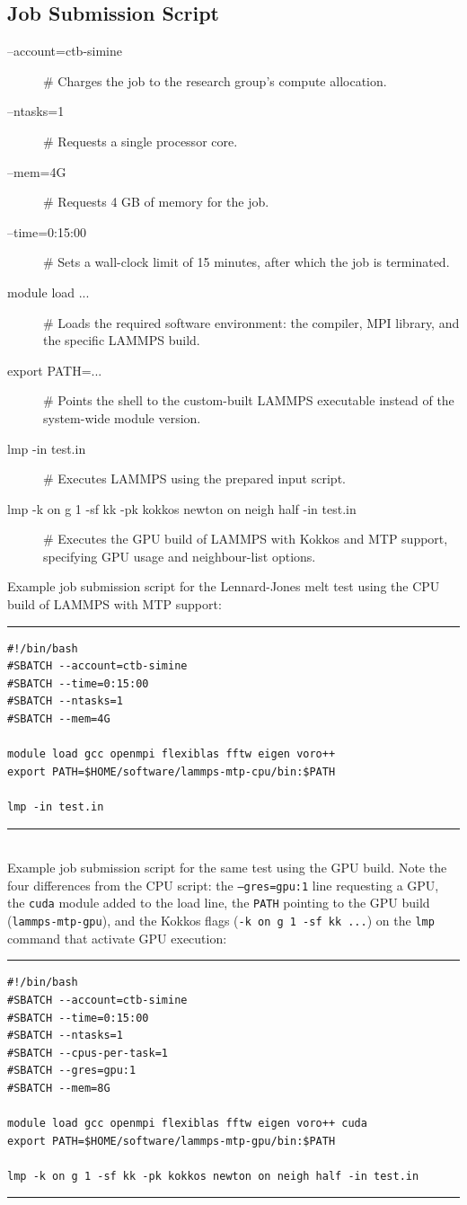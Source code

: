 \documentclass{article}
\begin{document}
\subsection{Job Submission Script}
\label{JSS}
\begin{description}
    \item[--account=ctb-simine] \# Charges the job to the research group's compute allocation.
    \item[--ntasks=1] \# Requests a single processor core.
    \item[--mem=4G] \# Requests 4 GB of memory for the job.
    \item[--time=0:15:00] \# Sets a wall-clock limit of 15 minutes, after which the job is terminated.
    \item[module load ...] \# Loads the required software environment: the compiler, MPI library, and the specific LAMMPS build.
    \item[export PATH=...] \# Points the shell to the custom-built LAMMPS executable instead of the system-wide module version.
    \item[lmp -in test.in] \# Executes LAMMPS using the prepared input script.
    \item[lmp -k on g 1 -sf kk -pk kokkos newton on neigh half -in test.in] \# Executes the GPU build of LAMMPS with Kokkos and MTP support, specifying GPU usage and neighbour-list options.
\end{description}
Example job submission script for the Lennard-Jones melt test using the CPU build of LAMMPS with MTP support:\\
\noindent\rule{\textwidth}{0.4pt}
\begin{verbatim}
#!/bin/bash
#SBATCH --account=ctb-simine
#SBATCH --time=0:15:00
#SBATCH --ntasks=1
#SBATCH --mem=4G

module load gcc openmpi flexiblas fftw eigen voro++
export PATH=$HOME/software/lammps-mtp-cpu/bin:$PATH

lmp -in test.in
\end{verbatim}
\noindent\rule{\textwidth}{0.4pt}\\
Example job submission script for the same test using the GPU build. Note the four differences from the CPU script: the \texttt{--gres=gpu:1} line requesting a GPU, the \texttt{cuda} module added to the load line, the \texttt{PATH} pointing to the GPU build (\texttt{lammps-mtp-gpu}), and the Kokkos flags (\texttt{-k on g 1 -sf kk ...}) on the \texttt{lmp} command that activate GPU execution:\\
\noindent\rule{\textwidth}{0.4pt}
\begin{verbatim}
#!/bin/bash
#SBATCH --account=ctb-simine
#SBATCH --time=0:15:00
#SBATCH --ntasks=1
#SBATCH --cpus-per-task=1
#SBATCH --gres=gpu:1
#SBATCH --mem=8G

module load gcc openmpi flexiblas fftw eigen voro++ cuda
export PATH=$HOME/software/lammps-mtp-gpu/bin:$PATH

lmp -k on g 1 -sf kk -pk kokkos newton on neigh half -in test.in
\end{verbatim}
\noindent\rule{\textwidth}{0.4pt}\\
\end{document}
